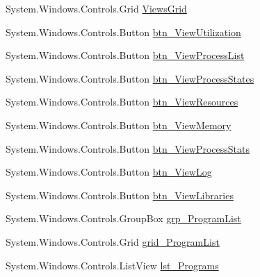 \begin{DoxyCompactItemize}
System.\+Windows.\+Controls.\+Grid \hyperlink{class_c_p_u___o_s___simulator_1_1_operating_system_main_window_a956a6d8e53d4f47e27b3ba0b237292c7}{Views\+Grid}
\item 
System.\+Windows.\+Controls.\+Button \hyperlink{class_c_p_u___o_s___simulator_1_1_operating_system_main_window_accf4bcea0f673199aba1c5cceae6c2d4}{btn\+\_\+\+View\+Utilization}
\item 
System.\+Windows.\+Controls.\+Button \hyperlink{class_c_p_u___o_s___simulator_1_1_operating_system_main_window_a1e066a439f2a2ae32884c1ab5bc836de}{btn\+\_\+\+View\+Process\+List}
\item 
System.\+Windows.\+Controls.\+Button \hyperlink{class_c_p_u___o_s___simulator_1_1_operating_system_main_window_a1f057538601b02d66df09bcc72059591}{btn\+\_\+\+View\+Process\+States}
\item 
System.\+Windows.\+Controls.\+Button \hyperlink{class_c_p_u___o_s___simulator_1_1_operating_system_main_window_a976a78ddaa5bc715f884140f1680b5f3}{btn\+\_\+\+View\+Resources}
\item 
System.\+Windows.\+Controls.\+Button \hyperlink{class_c_p_u___o_s___simulator_1_1_operating_system_main_window_aea0c29dfb4b666e71108189a8120ec7e}{btn\+\_\+\+View\+Memory}
\item 
System.\+Windows.\+Controls.\+Button \hyperlink{class_c_p_u___o_s___simulator_1_1_operating_system_main_window_a3a79b95c6d74117cf22ebe46072ab5f7}{btn\+\_\+\+View\+Process\+Stats}
\item 
System.\+Windows.\+Controls.\+Button \hyperlink{class_c_p_u___o_s___simulator_1_1_operating_system_main_window_a111ffd14f60b60a8f69189a634676784}{btn\+\_\+\+View\+Log}
\item 
System.\+Windows.\+Controls.\+Button \hyperlink{class_c_p_u___o_s___simulator_1_1_operating_system_main_window_a739ba19981cb569c28c9f4e9ef21a7b1}{btn\+\_\+\+View\+Libraries}
\item 
System.\+Windows.\+Controls.\+Group\+Box \hyperlink{class_c_p_u___o_s___simulator_1_1_operating_system_main_window_a9dca0481c9d2ec99d42298352858be2b}{grp\+\_\+\+Program\+List}
\item 
System.\+Windows.\+Controls.\+Grid \hyperlink{class_c_p_u___o_s___simulator_1_1_operating_system_main_window_a22160eecd007b7aedf48db6c64eb2da6}{grid\+\_\+\+Program\+List}
\item 
System.\+Windows.\+Controls.\+List\+View \hyperlink{class_c_p_u___o_s___simulator_1_1_operating_system_main_window_a08c9b2131c204ca49f85c7dbc3c0bde2}{lst\+\_\+\+Programs}
\item 

\end{DoxyCompactItemize}
